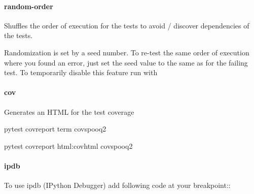 \documentclass[a4paper,10pt, twoside,english]{sphinxmanual}
\begin{document}
\paragraph{random-order}
\label{\detokenize{setup_development_testing:id2}}
Shuffles the order of execution for the tests to avoid / discover dependencies of the tests.

Randomization is set by a seed number. To re-test the same order of execution where you found
an error, just set the seed value to the same as for the failing test.
To temporarily disable this feature run with 


\paragraph{cov}
\label{\detokenize{setup_development_testing:id3}}
Generates an HTML for the test coverage
\def\sphinxLiteralBlockLabel{\label{\detokenize{setup_development_testing:id14}}}
\begin{sphinxVerbatim}[commandchars=\\\{\}]
\PYGZdl{} pytest \PYGZhy{}\PYGZhy{}cov\PYGZhy{}report term \PYGZhy{}\PYGZhy{}covspooq2
\end{sphinxVerbatim}
\def\sphinxLiteralBlockLabel{\label{\detokenize{setup_development_testing:id15}}}
\begin{sphinxVerbatim}[commandchars=\\\{\}]
\PYGZdl{} pytest \PYGZhy{}\PYGZhy{}cov\PYGZhy{}report html:cov\PYGZus{}html \PYGZhy{}\PYGZhy{}covspooq2
\end{sphinxVerbatim}


\paragraph{ipdb}
\label{\detokenize{setup_development_testing:id4}}\begin{description}
\item[{To use ipdb (IPython Debugger) add following code at your breakpoint::}] \leavevmode
\begin{sphinxVerbatim}[commandchars=\\\{\}]
 
\end{sphinxVerbatim}

\end{description}
\end{document}
